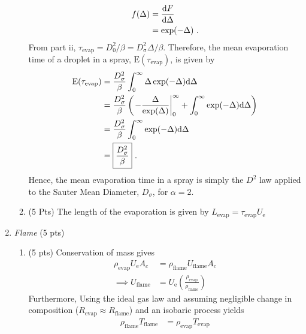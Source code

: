 \documentclass[12pt]{article}
\begin{document}
\begin{enumerate}[label=(\alph*)]
\begin{enumerate}[label=(\roman*)]
\begin{equation}
\begin{aligned}
							f(\Delta)&=\frac{\textup d F}{\textup d \Delta} \\
							&=\exp(-\Delta)\ .
						\end{aligned}
					\end{equation}
					From part ii, $\tau_\mathrm{evap}=D_0^2/\beta=D_\mathrm{\sigma}^2\Delta/\beta$. Therefore, the mean evaporation time of a droplet in a spray, $\mathrm{E}(\tau_\mathrm{evap})$, is given by
					\begin{equation}
						\begin{aligned}
							\mathrm{E}(\tau_\mathrm{evap})&=\frac{D_\sigma^2}{\beta}\int_0^\infty \Delta\exp(-\Delta)\textup d \Delta \\
							&=\frac{D_\sigma^2}{\beta}\left(\left . -\frac{\Delta}{\exp(\Delta)}\right|_0^\infty+\int_0^{\infty}\exp(-\Delta)\textup d\Delta\right)\\
							&=\frac{D_\sigma^2}{\beta}\int_0^{\infty}\exp(-\Delta)\textup d\Delta\\
							&=\boxed{\frac{D_\sigma^2}{\beta}}\ .
						\end{aligned}
					\end{equation}
					Hence, the mean evaporation time in a spray is simply the $D^2$ law applied to the Sauter Mean Diameter, $D_\sigma$, for $\alpha=2$.
				\item (5 Pts)
					The length of the evaporation is given by $L_\mathrm{evap}=\boxed{\tau_\mathrm{evap}U_\mathrm{e}}$
			\end{enumerate}
		\item \textit{Flame} (5 pts)
			\begin{enumerate}[label=(\roman*)]
				\item (5 pts) 
				Conservation of mass gives 
				\begin{equation}
					\begin{aligned}
						\rho_\mathrm{evap}U_\mathrm{e}A_c&=\rho_\mathrm{flame}U_\mathrm{flame}A_c\\
						\implies U_\mathrm{flame}&=U_\mathrm{e}\left(\frac{\rho_\mathrm{evap}}{\rho_\mathrm{flame}}\right)
					\end{aligned}
				\end{equation}
				Furthermore, Using the ideal gas law and assuming negligible change in composition ($R_\mathrm{evap}\approx R_\mathrm{flame}$) and an isobaric process yields
				\begin{equation}
					\begin{aligned}
						\rho_\mathrm{flame}T_\mathrm{flame}&=\rho_\mathrm{evap}T_\mathrm{evap}\\

\end{aligned}
\end{equation}
\end{enumerate}
\end{enumerate}
\end{document}
